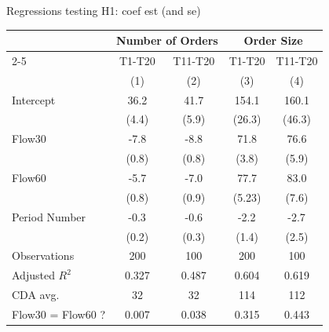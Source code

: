 \documentclass[10pt]{beamer}
\begin{document}
\begin{frame}{Regressions testing H1: coef est (and se)}
\begin{table}[H]
\centering    
\begin{threeparttable}
\begin{tabular}{@{\extracolsep{5pt}}lcccc}
& \multicolumn{2}{c}{Number of Orders} & \multicolumn{2}{c}{Order Size} \\
\cmidrule{2-5}
& T1-T20 & T11-T20 & T1-T20 & T11-T20 \\
& (1) & (2) & (3) & (4) \\
\midrule
Intercept & 36.2$ $ & 41.7$ $ & 154.1$ $ & 160.1$ $ \\
  & (4.4) & (5.9) & (26.3) & (46.3) \\
Flow30 & -7.8$ $ & -8.8$ $ & 71.8$ $ & 76.6$ $ \\
  & (0.8) & (0.8) & (3.8) & (5.9) \\
Flow60 & -5.7$ $ & -7.0$ $ & 77.7$ $ & 83.0$ $ \\
  & (0.8) & (0.9) & (5.23) & (7.6) \\
Period Number  & -0.3$^{}$ & -0.6$ $ & -2.2$^{}$ & -2.7$^{}$ \\
  & (0.2) & (0.3) & (1.4) & (2.5) \\
\midrule
Observations & 200 & 100 & 200 & 100 \\
Adjusted $R^2$ & 0.327 & 0.487 & 0.604 & 0.619 \\
\midrule
CDA avg. & 32 & 32 & 114 & 112 \\
Flow30 = Flow60 ? & 0.007 & 0.038 & 0.315 & 0.443 \\ %
\end{tabular}
\end{threeparttable}
\label{tab:TradersBehavior}
\end{table}
\end{frame}
\end{document}
